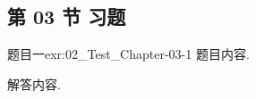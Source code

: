 \subsection{第 03 节 习题}


\begin{exercise}{题目一}{exr:02_Test_Chapter-03-1}
    题目内容.
\end{exercise}

\begin{solution}
    解答内容.
\end{solution}
